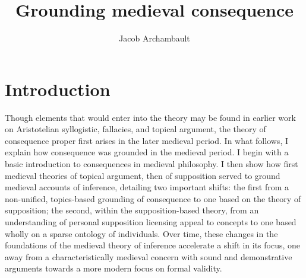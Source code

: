 \documentclass[a4paper, 11pt]{article}
\title{Grounding medieval consequence}
\author{Jacob Archambault}
\begin{document}
\maketitle


\begin{abstract}
\end{abstract}

\section{Introduction}


Though elements that would enter into the theory may be found in earlier work on Aristotelian syllogistic, fallacies, and topical argument, the theory of consequence proper first arises in the later medieval period. In what follows, I explain how consequence was grounded in the medieval period. I begin with a basic introduction to consequences in medieval philosophy. I then show how first medieval theories of topical argument, then of supposition served to ground medieval accounts of inference, detailing two important shifts: the first from a non-unified, topics-based grounding of consequence to one based on the theory of supposition; the second, within the supposition-based theory, from an understanding of personal supposition licensing appeal to concepts to one based wholly on a sparse ontology of individuals. Over time, these changes in the foundations of the medieval theory of inference accelerate a shift in its focus, one away from a characteristically medieval concern with sound and demonstrative arguments towards a more modern focus on formal validity.
\end{document}
